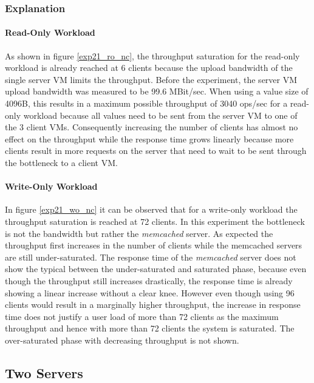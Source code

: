 \documentclass[report.tex]{subfiles}
\begin{document}
\subsubsection{Explanation}

\paragraph{Read-Only Workload}
As shown in figure \ref{exp21_ro_nc}, the throughput saturation for the read-only workload is already reached at 6 clients because the upload bandwidth of the single server VM limits the throughput. Before the experiment, the server VM upload bandwidth was measured to be 99.6 MBit/sec. When using a value size of 4096B, this results in a maximum possible throughput of 3040 ops/sec for a read-only workload because all values need to be sent from the server VM to one of the 3 client VMs. 
Consequently increasing the number of clients has almost no effect on the throughput while the response time grows linearly because more clients result in more requests on the server that need to wait to be sent through the bottleneck to a client VM.

\paragraph{Write-Only Workload}
In figure \ref{exp21_wo_nc} it can be observed that for a write-only workload the throughput saturation is reached at 72 clients. In this experiment the bottleneck is not the bandwidth but rather the \emph{memcached} server. 
As expected the throughput first increases in the number of clients while the memcached servers are still under-saturated. The response time of the \emph{memcached} server does not show the typical between the under-saturated and saturated phase, because even though the throughput still increases drastically, the response time is already showing a linear increase without a clear knee.
However even though using 96 clients would result in a marginally higher throughput, the increase in response time does not justify a user load of more than 72 clients as the maximum throughput and hence with more than 72 clients the system is saturated. The over-saturated phase with decreasing throughput is not shown.


\subsection{Two Servers}\label{exp22}
\end{document}
